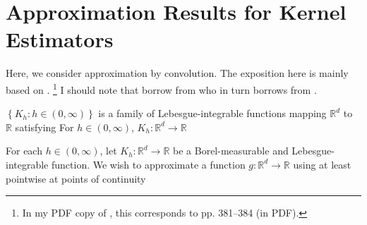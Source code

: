 
\section{Approximation Results for Kernel Estimators}

Here, we consider approximation by convolution.
The exposition here is mainly based on
\citet[pp. 362--365]{1999paganNonparametricEconometrics}.%
\footnote{In my PDF copy of \citet{1999paganNonparametricEconometrics}, this
corresponds to pp. 381--384 (in PDF).}
I should note that \citet{1999paganNonparametricEconometrics} borrow from
\citet{1962parzenEstimationProbabilityDensity} who in turn borrows from
\citet{1955bochnerHarmonicAnalysisTheory}.

\begin{assumption}
\label{asm--convolution-kernel}
\(\left\{ K_{h} : h \in (0, \infty) \right\}\) is a family of
Lebesgue-integrable functions mapping \(\mathbb{R}^{d}\) to \(\mathbb{R}\)
satisfying
For \(h \in (0, \infty)\), \(K_{h} : \mathbb{R}^{d} \to \mathbb{R}\)
\end{assumption}

For each \(h \in (0, \infty)\), let \(K_{h} : \mathbb{R}^{d} \to \mathbb{R}\) be
a Borel-measurable and Lebesgue-integrable function.
We wish to approximate a function \(g : \mathbb{R}^{d} \to \mathbb{R}\) using
at least pointwise at points of continuity



